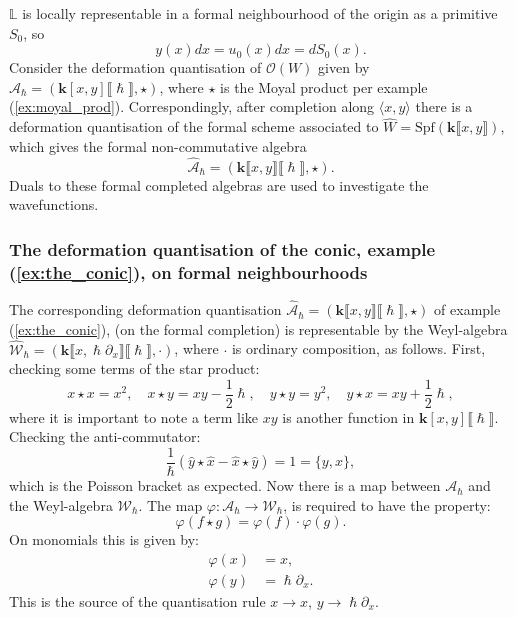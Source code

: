     
    \(\mathbb{L}\) is locally representable in a formal neighbourhood of the origin as a primitive \( S_0\), so
    \[ y(x) dx = u_0(x) dx = d S_0(x).\] 
    Consider the deformation quantisation of \( \mathcal{O}(W)\) given by \( \mathcal{A}_{\hslash} = (\mathbf{k}[x,y]\lBrack \hslash\rBrack,\star)\), where \( \star\) is the Moyal product per example (\ref{ex:moyal_prod}). Correspondingly, after completion along \( \langle x , y \rangle\) there is a deformation quantisation of the formal scheme associated to \(\widehat{W}= \mathrm{Spf}( \mathbf{k}\lBrack x,y \rBrack) \), which gives the formal non-commutative algebra 
    \begin{equation}
    \label{eqn:completed_conic}
    \widehat{\mathcal{A}}_{\hslash} = ( \mathbf{k} \lBrack x,y \rBrack \lBrack \hslash \rBrack , \star).
    \end{equation}
    Duals to these formal completed algebras are used to investigate the wavefunctions.
    
    \subsubsection{The deformation quantisation of the conic, example (\ref{ex:the_conic}), on formal neighbourhoods}
    The corresponding deformation quantisation \(\widehat{\mathcal{A}}_{\hslash} = ( \mathbf{k} \lBrack  x,y \rBrack \lBrack \hslash \rBrack , \star) \) of example (\ref{ex:the_conic}), (on the formal completion) is representable by the Weyl-algebra \( \widehat{\mathcal{W}}_{\hslash}=(\mathbf{k} \lBrack x, \hslash \partial_x \rBrack \lBrack \hslash \rBrack , \cdot) \), where \( \cdot\) is ordinary composition, as follows. First, checking some terms of the star product:
    \[ x \star x = x^2 , \quad  x \star y = x y - \frac{1}{2} \hslash , \quad y \star y = y^2, \quad y \star x = x y + \frac{1}{2}\hslash, \]
    where it is important to note a term like \(xy\) is another function in
    \( \mathbf{k}[ x,y ]\lBrack\hslash \rBrack\). Checking the anti-commutator:
    \[ \frac{1}{\hslash}\left( \hat{y} \star \hat{x} - \hat{x} \star \hat{y} \right) = 1 =  \{y,x\} , \]
    which is the Poisson bracket as expected. Now there is a map between \( \mathcal{A}_{\hslash}\) and the Weyl-algebra \(\mathcal{W}_{\hslash}\). The map \( \varphi  :  \mathcal{A}_{\hslash}   \rightarrow \mathcal{W}_{\hslash}\),  is required to have the property:
    \[ \varphi( f \star g ) = \varphi(f) \cdot \varphi(g).\] 
    On monomials this is given by:
    \begin{align*}
        \varphi(x) &= x, \\ 
        \varphi(y) &= \hslash \partial_x. 
    \end{align*}
    This is the source of the quantisation rule \( x \rightarrow x\), \( y \rightarrow \hslash \partial_x\).
    

